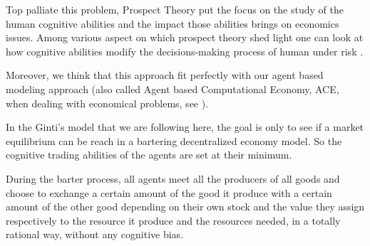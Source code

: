 \documentclass[a4paper]{article}
\begin{document}
Top palliate this problem, Prospect Theory put the focus on the study of the human cognitive abilities and the impact those abilities brings on economics issues. Among various aspect on which prospect theory shed light one can look at how cognitive abilities modify the decisions-making process of human under risk \cite{weber1998thedispositioneffectinsecuritiestradinganexperimentalanalysis}.

Moreover, we think that this approach fit perfectly with our agent based modeling approach (also called Agent based Computational Economy, ACE, when dealing with economical problems, see \cite{tesfatsion2001introductiontothespecialissueonagentbasedcomputationaleconomics}).

In the Ginti's model that we are following here, the goal is only to see if a market equilibrium can be reach in a bartering decentralized economy model. So the cognitive trading abilities of the agents are set at their minimum. 

During the barter process, all agents meet all the producers of all goods and choose to exchange a certain amount of the good it produce with a certain amount of the other good depending on their own stock and the value they assign respectively to the resource it produce and the resources needed, in a totally rational way, without any cognitive bias.


  
\end{document}
